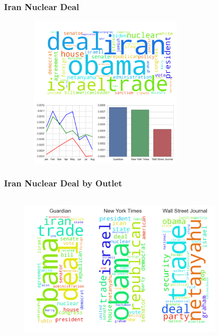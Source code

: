 \documentclass[11pt]{beamer}
\begin{document}
\begin{frame}
\frametitle{Iran Nuclear Deal}

\begin{figure}
\centering
\includegraphics[width=85mm,height=75mm]{figures/source_topic3.png}
\end{figure} 

\end{frame}


\begin{frame}
\frametitle{Iran Nuclear Deal by Outlet}

\begin{figure}
\centering
\includegraphics[width=100mm,height=75mm]{figures/source_within_topic3.png}
\end{figure} 

\end{frame}

\end{document}
